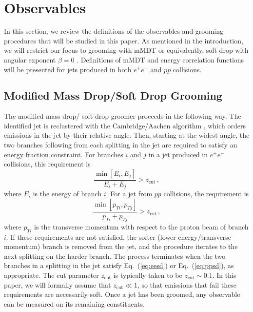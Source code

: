 \documentclass[a4paper,11pt]{article}
\def\zcut{z_{\text{cut}}}
\DeclareRobustCommand{\Eq}[1]{Eq.~(\ref{#1})}
\begin{document}
\section{Observables}\label{sec:obs}

In this section, we review the definitions of the observables and grooming procedures that will be studied in this paper.  As mentioned in the introduction, we will restrict our focus to grooming with mMDT \cite{Dasgupta:2013ihk,Dasgupta:2013via} or equivalently, soft drop with angular exponent $\beta = 0$  \cite{Larkoski:2014wba}.  Definitions of mMDT and energy correlation functions will be presented for jets produced in both $e^+e^-$ and $pp$ collisions.

\subsection{Modified Mass Drop/Soft Drop Grooming}\label{sec:sd}


The modified mass drop/ soft drop groomer proceeds in the following way.  The identified jet is reclustered with the Cambridge/Aachen algorithm \cite{Dokshitzer:1997in,Wobisch:1998wt,Wobisch:2000dk}, which orders emissions in the jet by their relative angle.  Then, starting at the widest angle, the two branches following from each splitting in the jet are required to satisfy an energy fraction constraint.  For branches $i$ and $j$ in a jet produced in $e^+e^-$ collisions, this requirement is
\begin{equation}\label{eq:eesd}
\frac{\min[E_i,E_j]}{E_i+E_j}>\zcut\,,
\end{equation}
where $E_i$ is the energy of branch $i$.
For a jet from $pp$ collisions, the requirement is
\begin{equation}\label{eq:ppsd}
\frac{\min[p_{Ti},p_{Tj}]}{p_{Ti}+p_{Tj}}>\zcut\,,
\end{equation}
where $p_{Ti}$ is the transverse momentum with respect to the proton beam of branch $i$.
If these requirements are not satisfied, the softer (lower energy/transverse momentum) branch is removed from the jet, and the procedure iterates to the next splitting on the harder branch.  The process terminates when the two branches in a splitting in the jet satisfy \Eq{eq:eesd} or \Eq{eq:ppsd}, as appropriate.  The cut parameter $\zcut$ is typically taken to be $\zcut \sim 0.1$.  In this paper, we will formally assume that $\zcut \ll 1$, so that emissions that fail these requirements are necessarily soft.  Once a jet has been groomed, any observable can be measured on its remaining constituents. 
\end{document}
